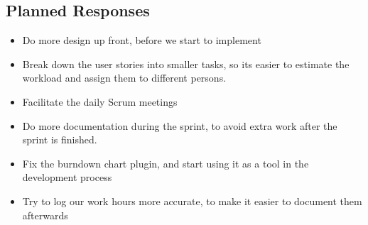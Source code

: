 \subsection{Planned Responses}
\begin{itemize}
\item Do more design up front, before we start to implement
\item Break down the user stories into smaller tasks, so its easier to estimate the workload and assign them to different persons.
\item Facilitate the daily Scrum meetings
\item Do more documentation during the sprint, to avoid extra work after the sprint is finished.
\item Fix the burndown chart plugin, and start using it as a tool in the development process
\item Try to log our work hours more accurate, to make it easier to document them afterwards
\end{itemize}

